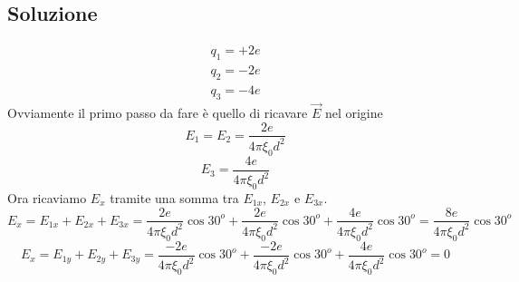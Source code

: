 \documentclass{book}
\begin{document}
\subsection {Soluzione}
\begin{equation}
  \begin{matrix}
    q_1=+2e\\
    q_2=-2e\\
    q_3=-4e
  \end{matrix}
\end{equation}
Ovviamente il primo passo da fare è quello di ricavare $\vec{E}$ nel origine
\begin{equation}
  E_1=E_2=\frac{2e}{4\pi\xi_0d^2}
\end{equation}
\begin{equation}
	E_3=\frac{4e}{4\pi\xi_0d^2}
\end{equation}
Ora ricaviamo $E_x$ tramite una somma tra $E_{1x}$, $E_{2x}$ e $E_{3x}$.
\begin{equation}
	E_x=E_{1x}+E_{2x}+E_{3x}=\frac{2e}{4\pi\xi_0d^2}\cos{30^o}+\frac{2e}{4\pi\xi_0d^2}\cos{30^o}+\frac{4e}{4\pi\xi_0d^2}\cos{30^o}=\frac{8e}{4\pi\xi_0d^2}\cos{30^o}
\end{equation}
\begin{equation}
	E_x=E_{1y}+E_{2y}+E_{3y}=\frac{-2e}{4\pi\xi_0d^2}\cos{30^o}+\frac{-2e}{4\pi\xi_0d^2}\cos{30^o}+\frac{4e}{4\pi\xi_0d^2}\cos{30^o}=0
\end{equation}
\end{document}

